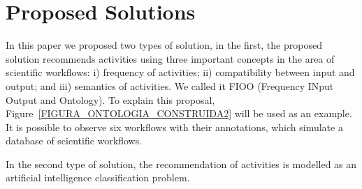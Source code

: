 \documentclass{doublecol-new}
\theoremstyle{TH}{
\newtheorem{lemma}{Lemma}
\newtheorem{theorem}[lemma]{Theorem}
\newtheorem{corrolary}[lemma]{Corrolary}
\newtheorem{conjecture}[lemma]{Conjecture}
\newtheorem{proposition}[lemma]{Proposition}
\newtheorem{claim}[lemma]{Claim}
\newtheorem{stheorem}[lemma]{Wrong Theorem}
\newtheorem{algorithm}{Algorithm}
}
\theoremstyle{THrm}{
\newtheorem{definition}{Definition}[section]
\newtheorem{question}{Question}[section]
\newtheorem{remark}{Remark}
\newtheorem{scheme}{Scheme}
}
\theoremstyle{THhit}{
\newtheorem{case}{Case}[section]
}
\begin{document}
%


\section*{Proposed Solutions}
In this paper we proposed two types of solution, in the first, the proposed solution recommends activities using three important concepts in the area of ​​scientific workflows: i) frequency of activities; ii) compatibility between input and output; and iii) semantics of activities. We called it FIOO (Frequency INput Output and Ontology). To explain this proposal, Figure~\ref{FIGURA_ONTOLOGIA_CONSTRUIDA2} will be used as an example. It is possible to observe six workflows with their annotations, which simulate a database of scientific workflows.

In the second type of solution, the recommendation of activities is modelled as an artificial intelligence classification problem.
\end{document}
